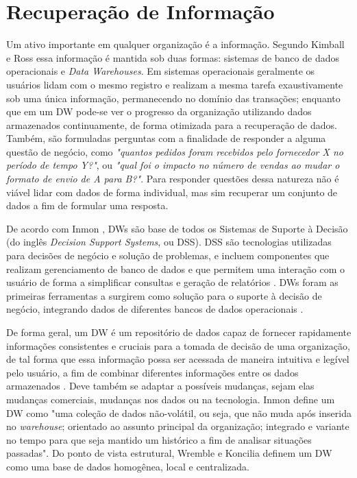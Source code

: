 \chapter{Recuperação de Informação}
\label{cap_2}

Um ativo importante em qualquer organização é a informação. Segundo Kimball e Ross \cite{kimball2002dw} essa informação é mantida sob duas formas: sistemas de banco de dados operacionais e \textit{Data Warehouses}. Em sistemas operacionais geralmente os usuários lidam com o mesmo registro e realizam a mesma tarefa exaustivamente sob uma única informação, permanecendo no domínio das transações; enquanto que em um DW pode-se ver o progresso da organização utilizando dados armazenados continuamente, de forma otimizada para a recuperação de dados. Também, são formuladas perguntas com a finalidade de responder a alguma questão de negócio, como \textit{"quantos pedidos foram recebidos pelo fornecedor X no período de tempo Y?"}, ou \textit{"qual foi o impacto no número de vendas ao mudar o formato de envio de A para B?"}. Para responder questões dessa natureza não é viável lidar com dados de forma individual, mas sim recuperar um conjunto de dados a fim de formular uma resposta.


De acordo com Inmon \cite{inmon2005building}, DWs são base de todos os Sistemas de Suporte à Decisão (do inglês \textit{Decision Support Systems}, ou DSS). DSS são tecnologias utilizadas para decisões de negócio e solução de problemas, 
e incluem componentes que realizam gerenciamento de banco de dados e que 
permitem uma interação com o usuário de forma a simplificar consultas e geração de relatórios 
\cite{shim2002past}. DWs foram as primeiras ferramentas a surgirem como solução para o 
suporte à decisão de negócio, integrando dados de diferentes bancos de dados operacionais 
\cite{inmon2005building, kimball2002dw}.

De forma geral, um DW é um repositório de dados capaz de fornecer rapidamente 
informações consistentes e cruciais para a tomada de decisão de uma organização, 
de tal forma que essa informação possa ser acessada de maneira intuitiva e legível 
pelo usuário, a fim de combinar diferentes informações entre os dados armazenados 
\cite{kimball2002dw}. Deve também se adaptar a possíveis mudanças, sejam elas mudanças comerciais, mudanças nos dados ou na tecnologia. Inmon \cite{inmon2005building} define um DW como "uma coleção de dados não-volátil, ou seja, que não muda após inserida no \textit{warehouse}; orientado ao assunto principal da organização; integrado e variante no tempo para que seja mantido um histórico a fim de analisar situações passadas". Do ponto de vista estrutural, Wremble e Koncilia \cite{wrembel2007data} definem um DW como uma base de dados homogênea, local e centralizada.

